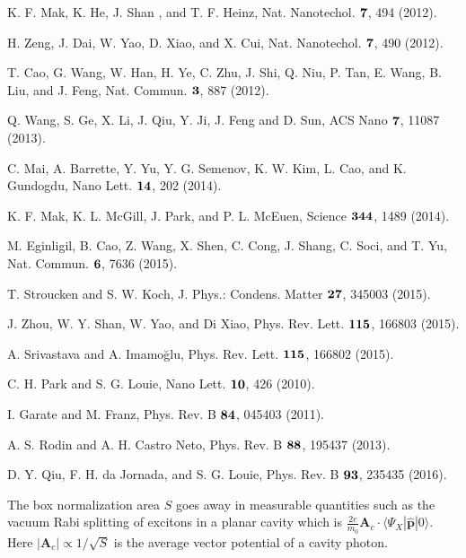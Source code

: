 \documentclass[prb,twocolumn,amsmath,amssymb,superscriptaddress,showpacs]{revtex4}
\begin{document}
\begin{thebibliography}{99}
K. F. Mak, K. He, J. Shan	, and T. F. Heinz, Nat. Nanotechol. $\bf7$, 494 (2012).

H. Zeng, J. Dai, W. Yao, D. Xiao, and X. Cui, Nat. Nanotechol. $\bf7$, 490 (2012).

T. Cao,	G. Wang,	W. Han, H. Ye, C. Zhu, J. Shi, Q. Niu, P. Tan,	E. Wang, B. Liu, and J. Feng, Nat. Commun. $\bf3$, 887 (2012).

Q. Wang, S. Ge, X. Li, J. Qiu, Y. Ji, J. Feng and D. Sun, ACS Nano $\bf7$, 11087 (2013).

C. Mai, A. Barrette, Y. Yu, Y. G. Semenov, K. W. Kim, L. Cao, and K. Gundogdu, Nano Lett. $\bf14$, 202 (2014).

K. F. Mak, K. L. McGill, J. Park, and P. L. McEuen, Science $\bf344$, 1489 (2014).

M. Eginligil,	B. Cao,	Z. Wang, X. Shen, C. Cong,	J. Shang, C. Soci, and T. Yu, Nat. Commun. $\bf6$, 7636 (2015).

T. Stroucken and S. W. Koch, J. Phys.: Condens. Matter $\bf27$, 345003 (2015).

J. Zhou, W. Y. Shan, W. Yao, and Di Xiao, Phys. Rev. Lett. $\bf115$, 166803 (2015).

A. Srivastava and A. Imamo\u{g}lu, Phys. Rev. Lett. $\bf115$, 166802 (2015).

C. H. Park and S. G. Louie, Nano Lett. $\bf10$, 426 (2010).

I. Garate and M. Franz, Phys. Rev. B $\bf84$, 045403 (2011).

A. S. Rodin and A. H. Castro Neto, Phys. Rev. B $\bf88$, 195437 (2013).

D. Y. Qiu, F. H. da Jornada, and S. G. Louie, Phys. Rev. B $\bf93$, 235435 (2016).

The box normalization area $S$ goes away in measurable quantities such as the vacuum Rabi splitting of excitons in a planar cavity which is $\frac{2e}{m_0}\mathbf A_c\cdot\langle\Psi_X|\hat{\mathbf p}|0\rangle$. Here $|\mathbf A_c|\propto 1/\sqrt{S}$ is the average vector potential of a cavity photon. 


\end{thebibliography}
\end{document}
